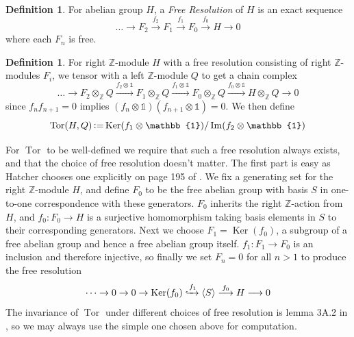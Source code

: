 \documentclass[11pt,a4paper,twoside]{article}
\theoremstyle{plain}
\theoremstyle{definition}
\newtheorem{defn}[thm]{Definition}
\theoremstyle{definition}
\theoremstyle{definition}
\theoremstyle{definition}
\theoremstyle{definition}
\DeclareMathOperator{\Ima}{Im}
\DeclareMathOperator{\Ker}{Ker}
\DeclareMathOperator{\Tor}{Tor}
\DeclareMathOperator{\coloneqq}{\vcentcolon=}
\begin{document}
\vspace{2mm}
\begin{defn}\label{Def:FreeResolution}
For abelian group $H$, a \emph{Free Resolution} of $H$ is an exact sequence 
$$ \dots\longrightarrow F_2\overset{f_2}\longrightarrow F_1\overset{f_1}\longrightarrow F_0\overset{f_0}\longrightarrow H\longrightarrow 0 $$
where each $F_n$ is free.
\end{defn}
\vspace{2mm}
\begin{defn}
For right $\mathbb{Z}$-module $H$ with a free resolution consisting of right $\mathbb{Z}$-modules $F_i$, we tensor with a left $\mathbb{Z}$-module $Q$ to get a chain complex 
$$\dots\longrightarrow F_2\otimes_\mathbb{Z}Q\xrightarrow{f_2\otimes\mathbb{1}} F_1\otimes_\mathbb{Z}Q\xrightarrow{f_1\otimes\mathbb{1}} F_0\otimes_\mathbb{Z}Q\xrightarrow{f_0\otimes\mathbb{1}} H\otimes_\mathbb{Z}Q\longrightarrow0$$
since $f_nf_{n\!+\!1}\!=\!0$ implies $(f_n\otimes\mathbb{1})(f_{n\!+\!1}\otimes\mathbb{1})\!=\!0$. We then define
$$\Tor(H,Q)\coloneqq\Ker(f_1\otimes\mathbb{1})/\Ima(f_2\otimes\mathbb{1})$$
\end{defn}
For $\Tor$ to be well-defined we require that such a free resolution always exists, and that the choice of free resolution doesn't matter. The first part is easy as Hatcher chooses one explicitly on page 195 of \cite{algebraictopology}. We fix a generating set for the right $\mathbb{Z}$-module $H$, and define $F_0$ to be the free abelian group with basis  $S$ in one-to-one correspondence with these generators. $F_0$ inherits the right $\mathbb{Z}$-action from $H$, and $f_0\!:\!F_0\longrightarrow H$ is a surjective homomorphism taking basis elements in $S$ to their corresponding generators. Next we choose $F_1=\Ker(f_0)$, a subgroup of a free abelian group and hence a free abelian group itself. $f_1\!:\!F_1\longrightarrow F_0$ is an inclusion and therefore injective, so finally we set $F_n=0$ for all $n>1$ to produce the free resolution
$$ \dots\rightarrow 0 \rightarrow 0 \rightarrow \Ker(f_0)\xhookrightarrow{f_1} \langle S\rangle\overset{f_0}\longrightarrow H\longrightarrow 0$$
The invariance of $\Tor$ under different choices of free resolution is lemma 3A.2 in \cite{algebraictopology}, so we may always use the simple one chosen above for computation.
\end{document}
